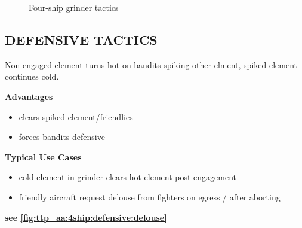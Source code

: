 \begin{figure}[htbp]
    \caption{Four-ship grinder tactics}%
    \label{fig:ttp_aa:4ship:offensive:grinder}
\end{figure}

\clearpage

\subsection{DEFENSIVE TACTICS}

\begin{tcoloritemize}
    \blueitem[Delouse] 
    Non-engaged element turns hot on bandits spiking other elment,
    spiked element continues cold.

    \bigskip
    \textbf{Advantages}
    \begin{itemize}
        \item clears spiked element/friendlies
        \item forces bandits defensive
    \end{itemize}

    \textbf{Typical Use Cases}
    \begin{itemize}
        \item cold element in grinder clears hot element post-engagement
        \item friendly aircraft request delouse from fighters on egress / after aborting
    \end{itemize}

    \hfill\textbf{see \cref{fig:ttp_aa:4ship:defensive:delouse}}
\end{tcoloritemize}


